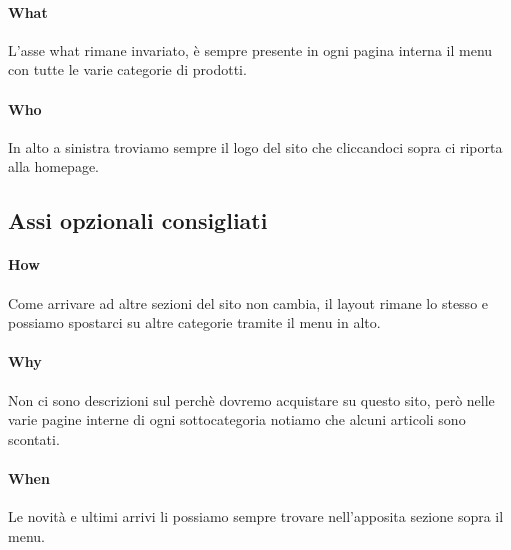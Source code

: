 \documentclass[12pt]{article}
\begin{document}
	\paragraph{What} L'asse what rimane invariato, è sempre presente in ogni pagina interna il menu con tutte le varie categorie di prodotti.
	\paragraph{Who} In alto a sinistra troviamo sempre il logo del sito che cliccandoci sopra ci riporta alla homepage.
	\\
	\subsection{Assi opzionali consigliati}
	\vspace{0.5cm}
	\paragraph{How} Come arrivare ad altre sezioni del sito non cambia, il layout rimane lo stesso e possiamo spostarci su altre categorie tramite il menu in alto.
	\paragraph{Why} Non ci sono descrizioni sul perchè dovremo acquistare su questo sito, però nelle varie pagine interne di ogni sottocategoria notiamo che alcuni articoli sono scontati.
	\paragraph{When} Le novità e ultimi arrivi li possiamo sempre trovare nell'apposita sezione sopra il menu.
	\newpage
\end{document}
